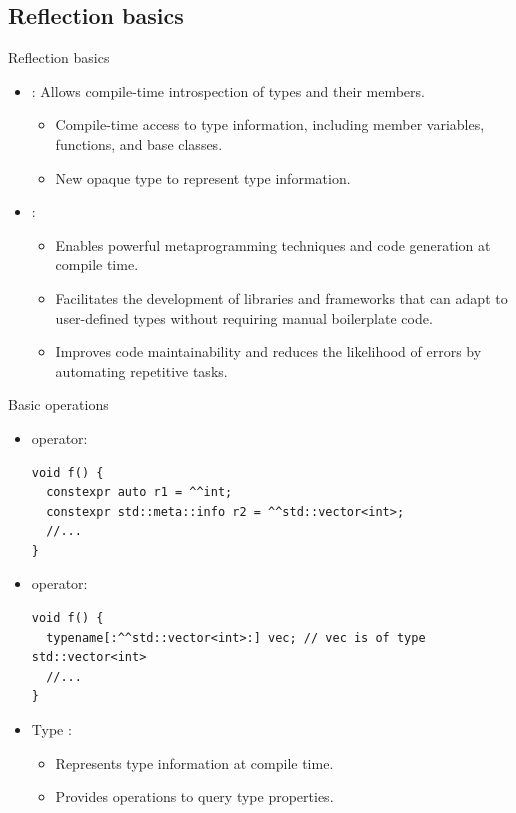 \subsection{Reflection basics}

\begin{frame}[t,fragile]{Reflection basics}
  \begin{itemize}
    \item {}: Allows compile-time introspection of types and their members.
      \begin{itemize}
        \item Compile-time access to type information, including member variables, functions, and base classes.
        \item New opaque type  to represent type information.
      \end{itemize}

    \item {}:
      \begin{itemize}
        \item Enables powerful metaprogramming techniques and code generation at compile time.
        \item Facilitates the development of libraries and frameworks that can adapt to user-defined types without requiring manual boilerplate code.
        \item Improves code maintainability and reduces the likelihood of errors by automating repetitive tasks.
      \end{itemize}
  \end{itemize}
\end{frame}

\begin{frame}[t,fragile]{Basic operations}
  \begin{itemize}
    \item {} operator:
\begin{lstlisting}
void f() {
  constexpr auto r1 = ^^int;
  constexpr std::meta::info r2 = ^^std::vector<int>;
  //...
}
\end{lstlisting}

  \item {} operator:
\begin{lstlisting}
void f() {
  typename[:^^std::vector<int>:] vec; // vec is of type std::vector<int>
  //...
}
\end{lstlisting}

  \item Type :
    \begin{itemize}
      \item Represents type information at compile time.
      \item Provides operations to query type properties.
    \end{itemize}
  \end{itemize}
\end{frame}